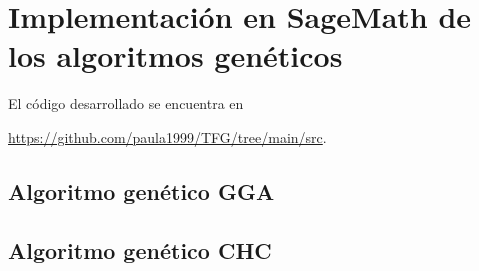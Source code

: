 \chapter[Implementación en SageMath de los algoritmos genéticos]{Implementación en SageMath de los algoritmos genéticos}
\label{annex:sage-geneticos}


El código desarrollado se encuentra en
\begin{center}
    \url{https://github.com/paula1999/TFG/tree/main/src}.
\end{center}


\section{Algoritmo genético GGA}

\section{Algoritmo genético CHC}

